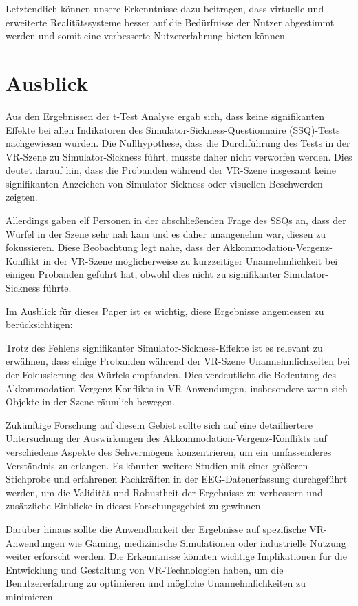 \documentclass[conference]{IEEEtran}
\begin{document}
Letztendlich können unsere Erkenntnisse dazu beitragen, dass virtuelle und erweiterte Realitätssysteme besser auf die Bedürfnisse der Nutzer abgestimmt werden und somit eine verbesserte Nutzererfahrung bieten können.
\section{Ausblick}
Aus den Ergebnissen der t-Test Analyse ergab sich, dass keine signifikanten Effekte bei allen Indikatoren des Simulator-Sickness-Questionnaire (SSQ)-Tests nachgewiesen wurden. Die Nullhypothese, dass die Durchführung des Tests in der VR-Szene zu Simulator-Sickness führt, musste daher nicht verworfen werden. Dies deutet darauf hin, dass die Probanden während der VR-Szene insgesamt keine signifikanten Anzeichen von Simulator-Sickness oder visuellen Beschwerden zeigten.

Allerdings gaben elf Personen in der abschließenden Frage des SSQs an, dass der Würfel in der Szene sehr nah kam und es daher unangenehm war, diesen zu fokussieren. Diese Beobachtung legt nahe, dass der Akkommodation-Vergenz-Konflikt in der VR-Szene möglicherweise zu kurzzeitiger Unannehmlichkeit bei einigen Probanden geführt hat, obwohl dies nicht zu signifikanter Simulator-Sickness führte.

Im Ausblick für dieses Paper ist es wichtig, diese Ergebnisse angemessen zu berücksichtigen:

Trotz des Fehlens signifikanter Simulator-Sickness-Effekte ist es relevant zu erwähnen, dass einige Probanden während der VR-Szene Unannehmlichkeiten bei der Fokussierung des Würfels empfanden. Dies verdeutlicht die Bedeutung des Akkommodation-Vergenz-Konflikts in VR-Anwendungen, insbesondere wenn sich Objekte in der Szene räumlich bewegen.

Zukünftige Forschung auf diesem Gebiet sollte sich auf eine detailliertere Untersuchung der Auswirkungen des Akkommodation-Vergenz-Konflikts auf verschiedene Aspekte des Sehvermögens konzentrieren, um ein umfassenderes Verständnis zu erlangen. Es könnten weitere Studien mit einer größeren Stichprobe und erfahrenen Fachkräften in der EEG-Datenerfassung durchgeführt werden, um die Validität und Robustheit der Ergebnisse zu verbessern und zusätzliche Einblicke in dieses Forschungsgebiet zu gewinnen.

Darüber hinaus sollte die Anwendbarkeit der Ergebnisse auf spezifische VR-Anwendungen wie Gaming, medizinische Simulationen oder industrielle Nutzung weiter erforscht werden. Die Erkenntnisse könnten wichtige Implikationen für die Entwicklung und Gestaltung von VR-Technologien haben, um die Benutzererfahrung zu optimieren und mögliche Unannehmlichkeiten zu minimieren.
\end{document}
